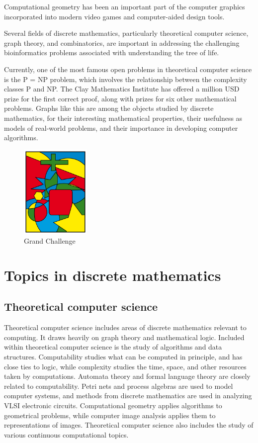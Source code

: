 \documentclass{article}
\begin{document}
Computational geometry has been an important part of the computer graphics incorporated into modern video games and computer-aided design tools.

Several fields of discrete mathematics, particularly theoretical computer science, graph theory, and combinatorics, are important in addressing the challenging bioinformatics problems associated with understanding the tree of life.

Currently, one of the most famous open problems in theoretical computer science is the P = NP problem, which involves the relationship between the complexity classes P and NP. The Clay Mathematics Institute has offered a million USD prize for the first correct proof, along with prizes for six other mathematical problems.
Graphs like this are among the objects studied by discrete mathematics, for their interesting mathematical properties, their usefulness as models of real-world problems, and their importance in developing computer algorithms.
\begin{figure}[h]
\includegraphics[width=0.3\textwidth]{sb.png}
\caption{Grand Challenge}
\end{figure}
\newpage
\section{Topics in discrete mathematics}
\subsection{Theoretical computer science}
Theoretical computer science includes areas of discrete mathematics relevant to computing. It draws heavily on graph theory and mathematical logic. Included within theoretical computer science is the study of algorithms and data structures. Computability studies what can be computed in principle, and has close ties to logic, while complexity studies the time, space, and other resources taken by computations. Automata theory and formal language theory are closely related to computability. Petri nets and process algebras are used to model computer systems, and methods from discrete mathematics are used in analyzing VLSI electronic circuits. Computational geometry applies algorithms to geometrical problems, while computer image analysis applies them to representations of images. Theoretical computer science also includes the study of various continuous computational topics. 
\end{document}
